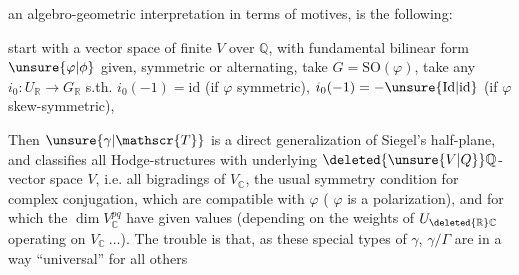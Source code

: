 an algebro-geometric interpretation in terms of  motives, is the following:

start with a vector space of finite \unsure{:|{}} $V$ over $\mathbb{Q}$, with  fundamental bilinear form $\unsure{\varphi|\phi}$ given, symmetric or alternating, take $G=\mathrm{SO}(\varphi)$, take any $i_0:U_{\mathbb{R}}\to G_{\mathbb{R}}$ s.th. $i_0(-1)=\mathrm{id}$ (if $\varphi$ symmetric), $i_0(-1)=-\unsure{\mathrm{Id}|\mathrm{id}}$ (if $\varphi$  skew-symmetric),   

Then $\unsure{\gamma|\mathscr{T}}$ is a direct generalization of Siegel's half-plane, and classifies all Hodge-structures  with underlying $\deleted{\unsure{V|Q}}\mathbb{Q}$-vector space $V$,  i.e. all bigradings of $V_{\mathbb{C}}$,   the usual symmetry condition for complex conjugation, which are compatible with $\varphi$ ( $\varphi$ is a polarization), and for which the $\dim V_{\mathbb{C}}^{pq}$ have given values  (depending on the weights of $U_{\deleted{\mathbb{R}}\mathbb{C}}$ operating on $V_{\mathbb{C}}\ \ldots$). The trouble is that,  as these special types of $\gamma$, $\gamma/\Gamma$ are in a way ``universal'' for all others

